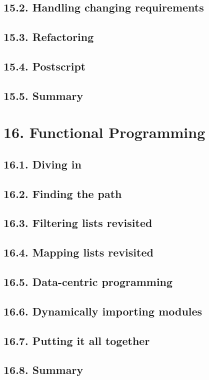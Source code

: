 \documentclass[oneside,12pt]{book}
\begin{document}
\section{15.2. Handling changing requirements}
\section{15.3. Refactoring}
\section{15.4. Postscript}
\section{15.5. Summary}
   
\chapter{16. Functional Programming}
\section{16.1. Diving in}
\section{16.2. Finding the path}
\section{16.3. Filtering lists revisited}
\section{16.4. Mapping lists revisited}
\section{16.5. Data-centric programming}
\section{16.6. Dynamically importing modules}
\section{16.7. Putting it all together}
\section{16.8. Summary}
   
\end{document}

